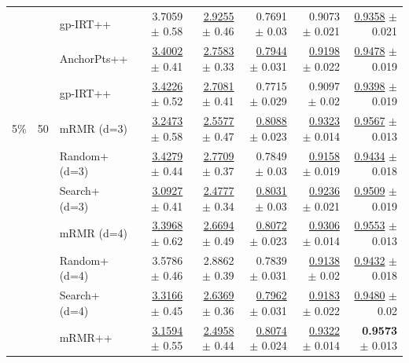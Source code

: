 \begin{longtable}{llp{}rrrrr}
 &  & gp-IRT++ & 3.7059 {\scriptsize $\pm$ 0.58} & \underline{2.9255} {\scriptsize $\pm$ 0.46} & 0.7691 {\scriptsize $\pm$ 0.03} & 0.9073 {\scriptsize $\pm$ 0.021} & \underline{0.9358} {\scriptsize $\pm$ 0.021} \\
 &  & AnchorPts++ & \underline{3.4002} {\scriptsize $\pm$ 0.41} & \underline{2.7583} {\scriptsize $\pm$ 0.33} & \underline{0.7944} {\scriptsize $\pm$ 0.031} & \underline{0.9198} {\scriptsize $\pm$ 0.022} & \underline{0.9478} {\scriptsize $\pm$ 0.019} \\
 &  & gp-IRT++ & \underline{3.4226} {\scriptsize $\pm$ 0.52} & \underline{2.7081} {\scriptsize $\pm$ 0.41} & 0.7715 {\scriptsize $\pm$ 0.029} & 0.9097 {\scriptsize $\pm$ 0.02} & \underline{0.9398} {\scriptsize $\pm$ 0.019} \\
\midrule
5\% & 50 & mRMR (d=3) & \underline{3.2473} {\scriptsize $\pm$ 0.58} & \underline{2.5577} {\scriptsize $\pm$ 0.47} & \underline{0.8088} {\scriptsize $\pm$ 0.023} & \underline{0.9323} {\scriptsize $\pm$ 0.014} & \underline{0.9567} {\scriptsize $\pm$ 0.013} \\
 &  & Random+ (d=3) & \underline{3.4279} {\scriptsize $\pm$ 0.44} & \underline{2.7709} {\scriptsize $\pm$ 0.37} & 0.7849 {\scriptsize $\pm$ 0.03} & \underline{0.9158} {\scriptsize $\pm$ 0.019} & \underline{0.9434} {\scriptsize $\pm$ 0.018} \\
 &  & Search+ (d=3) & \underline{3.0927} {\scriptsize $\pm$ 0.41} & \underline{2.4777} {\scriptsize $\pm$ 0.34} & \underline{0.8031} {\scriptsize $\pm$ 0.03} & \underline{0.9236} {\scriptsize $\pm$ 0.021} & \underline{0.9509} {\scriptsize $\pm$ 0.019} \\
 &  & mRMR (d=4) & \underline{3.3968} {\scriptsize $\pm$ 0.62} & \underline{2.6694} {\scriptsize $\pm$ 0.49} & \underline{0.8072} {\scriptsize $\pm$ 0.023} & \underline{0.9306} {\scriptsize $\pm$ 0.014} & \underline{0.9553} {\scriptsize $\pm$ 0.013} \\
 &  & Random+ (d=4) & 3.5786 {\scriptsize $\pm$ 0.46} & 2.8862 {\scriptsize $\pm$ 0.39} & 0.7839 {\scriptsize $\pm$ 0.031} & \underline{0.9138} {\scriptsize $\pm$ 0.02} & \underline{0.9432} {\scriptsize $\pm$ 0.018} \\
 &  & Search+ (d=4) & \underline{3.3166} {\scriptsize $\pm$ 0.45} & \underline{2.6369} {\scriptsize $\pm$ 0.36} & \underline{0.7962} {\scriptsize $\pm$ 0.031} & \underline{0.9183} {\scriptsize $\pm$ 0.022} & \underline{0.9480} {\scriptsize $\pm$ 0.02} \\
 &  & mRMR++ & \underline{3.1594} {\scriptsize $\pm$ 0.55} & \underline{2.4958} {\scriptsize $\pm$ 0.44} & \underline{0.8074} {\scriptsize $\pm$ 0.024} & \underline{0.9322} {\scriptsize $\pm$ 0.014} & \textbf{0.9573} {\scriptsize $\pm$ 0.013} \\

\end{longtable}
